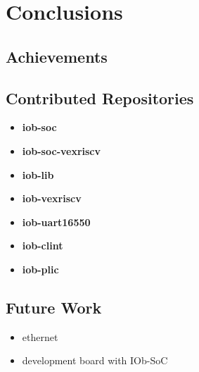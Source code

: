 \chapter{Conclusions}
\label{chapter:conclusions}

\section{Achievements}
\label{section:achievements}

\section{Contributed Repositories}
\label{section:contributions}
\begin{itemize}
    \item \textbf{iob-soc}
    \item \textbf{iob-soc-vexriscv}
    \item \textbf{iob-lib}
    \item \textbf{iob-vexriscv}
    \item \textbf{iob-uart16550}
    \item \textbf{iob-clint}
    \item \textbf{iob-plic}
\end{itemize}

\section{Future Work}
\label{section:future}
\begin{itemize}
    \item ethernet
    \item development board with IOb-SoC
\end{itemize}
